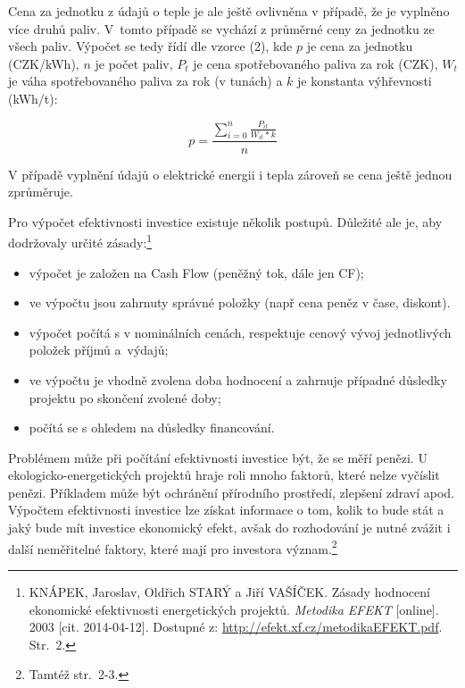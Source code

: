 \documentclass[11pt,a4paper]{article}
\newcounter{subsubsubsection}
\begin{document}
Cena za jednotku z údajů o teple je ale ještě ovlivněna v případě, že je vyplněno více druhů paliv. V~tomto případě se vychází z průměrné ceny za jednotku ze všech paliv. Výpočet se tedy řídí dle vzorce (2), kde $p$ je cena za jednotku (CZK/kWh), $n$ je počet paliv, $P_{t}$ je cena spotřebovaného paliva za rok (CZK), $W_{t}$ je váha spotřebovaného paliva za rok (v tunách) a $k$ je konstanta výhřevnosti (kWh/t): 

\begin{equation}
p = \frac{\sum_{i=0}^{n} {\frac{P_{it}}{W_{it} * k}}}{n}
\end{equation}

V případě vyplnění údajů o elektrické energii i tepla zároveň se cena ještě jednou zprůměruje. 
\vspace{0.5cm}

Pro výpočet efektivnosti investice existuje několik postupů. Důležité ale je, aby dodržovaly určité zásady:\footnote{KNÁPEK, Jaroslav, Oldřich STARÝ a Jiří VAŠÍČEK. Zásady hodnocení ekonomické efektivnosti energetických projektů. \textit{Metodika EFEKT} [online]. 2003 [cit. 2014-04-12]. Dostupné z: \url{http://efekt.xf.cz/metodikaEFEKT.pdf}. Str.~2.}

\begin{itemize}
\item výpočet je založen na Cash Flow (peněžný tok, dále jen CF);
\item ve výpočtu jsou zahrnuty správné položky (např cena peněz v čase, diskont).
\item výpočet počítá s v nominálních cenách, respektuje cenový vývoj jednotlivých položek příjmů a~výdajů;
\item ve výpočtu je vhodně zvolena doba hodnocení a zahrnuje případné důsledky projektu po skončení zvolené doby;
\item počítá se s ohledem na důsledky financování.
\end{itemize}  

Problémem může při počítání efektivnosti investice být, že se měří penězi. U ekologicko-energetických projektů hraje roli mnoho faktorů, které nelze vyčíslit penězi. Příkladem může být ochránění přírodního prostředí, zlepšení zdraví apod. Výpočtem efektivnosti investice lze získat informace o tom, kolik to bude stát a jaký bude mít investice ekonomický efekt, avšak do rozhodování je nutné zvážit i další neměřitelné faktory, které mají pro investora význam.\footnote{Tamtéž str.~2-3.}
\end{document}
